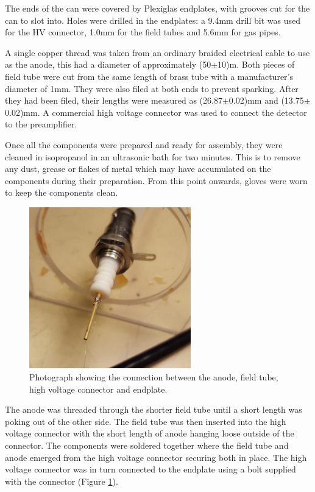 The ends of the can were covered by Plexiglas endplates, with grooves cut for the can to slot into. Holes were drilled in the endplates: a 9.4mm drill bit was used for the HV connector, 1.0mm for the field tubes and 5.6mm for gas pipes.

A single copper thread was taken from an ordinary braided electrical cable to use as the anode, this had a diameter of approximately (50$\pm$10)\textmu m. Both pieces of field tube were cut from the same length of brass tube with a manufacturer's diameter of 1mm. They were also filed at both ends to prevent sparking. After they had been filed, their lengths were measured as (26.87$\pm$0.02)mm and (13.75$\pm$0.02)mm. A commercial high voltage connector was used to connect the detector to the preamplifier.

Once all the components were prepared and ready for assembly, they were cleaned in isopropanol in an ultrasonic bath for two minutes. This is to remove any dust, grease or flakes of metal which may have accumulated on the components during their preparation. From this point onwards, gloves were worn to keep the components clean.

\begin{figure}[h]
  \centering
  \includegraphics[width=7cm]{HVconnector.jpg}
  \caption{Photograph showing the connection between the anode, field tube, high voltage connector and endplate.}
  \label{fig:HVC}
\end{figure}

The anode was threaded through the shorter field tube until a short length was poking out of the other side. The field tube was then inserted into the high voltage connector with the short length of anode hanging loose outside of the connector. The components were soldered together where the field tube and anode emerged from the high voltage connector securing both in place. The high voltage connector was in turn connected to the endplate using a bolt supplied with the connector (Figure \ref{fig:HVC}).

